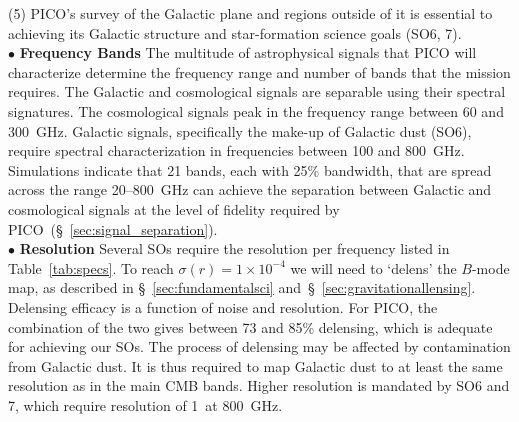 \documentclass[PICOReport.tex]{subfiles}
\begin{document}
(5) PICO's survey of the Galactic plane and regions outside of it is essential to achieving its Galactic structure  and star-formation science goals (SO6, 7). \\
%
$\bullet$ {\bf Frequency Bands} \hspace{0.1in} The multitude of astrophysical signals that PICO will characterize determine the frequency range and number of bands that the mission requires. The Galactic and cosmological signals are separable using their spectral signatures. The cosmological signals peak in the frequency range between 60 and 300~GHz. Galactic signals, specifically the make-up of Galactic dust (SO6), require spectral characterization in frequencies between 100 and 800~GHz. Simulations indicate that 21 bands, each with 25\% bandwidth, that are spread across the range 20--800~GHz can achieve the separation between Galactic and cosmological signals at the level of fidelity required by PICO~(\S~\ref{sec:signal_separation}). \\
%
$\bullet$ {\bf Resolution} \hspace{0.1in} 
Several \ac{SOs} require the resolution per frequency listed in Table~\ref{tab:specs}. To reach $\sigma(r) = 1\times10^{-4}$ we will need to `delens' the $B$-mode map, as described in \S~\ref{sec:fundamentalsci} and~\S~\ref{sec:gravitationallensing}. Delensing efficacy is a function of noise and resolution. For PICO, the combination of the two gives between 73 and 85\% delensing, which is adequate for achieving our \ac{SOs}. The process of delensing may be affected by contamination from Galactic dust. It is thus required to map Galactic dust to at least the same resolution as in the main CMB bands.  Higher resolution is mandated by SO6 and 7, which require resolution of 1\arcmin\ at 800~GHz. 
\end{document}
